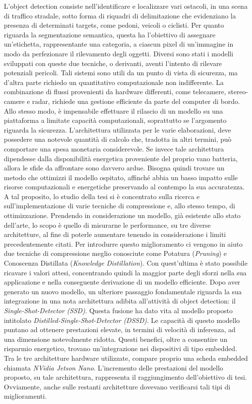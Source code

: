 L'object detection consiste nell'identificare e localizzare vari ostacoli, in una scena di traffico stradale, sotto forma di riquadri di delimitazione che evidenziano la presenza di determinati targets, come pedoni, veicoli o ciclisti. Per quanto riguarda la segmentazione semantica, questa ha l'obiettivo di assegnare un'etichetta, rappresentante una categoria, a ciascun pixel di un'immagine in modo da perfezionare il rilevamento degli oggetti. Diversi sono stati i modelli sviluppati con queste due tecniche, o derivanti, aventi l'intento di rilevare potenziali pericoli. Tali sistemi sono utili da un punto di vista di sicurezza, ma d'altra parte richiedo un quantitativo computazionale non indifferente. La combinazione di flussi provenienti da hardware differenti, come telecamere, stereo-camere e radar, richiede una gestione efficiente da parte del computer di bordo. Allo stesso modo, è impensabile effettuare il rilascio di un modello su una piattaforma a limitate capacità computazionali, soprattutto se l'argomento riguarda la sicurezza. L'architettura utilizzata per le varie elaborazioni, deve possedere una notevole quantità di calcolo che, tradotta in altri termini, può comportare una spesa monetaria considerevole. Se invece tale architettura dipendesse dalla disponibilità energetica proveniente del proprio vano batteria, allora le sfide da affrontare sono davvero ardue. Bisogna quindi trovare un metodo che ottimizzi il modello ospitato, affinché abbia un basso impatto sulle risorse computazionali e energetiche preservando al contempo la sua accuratezza. A tal proposito, lo studio della tesi si è concentrato sulla ricerca e sull'implementazione di varie tecniche di compressione e, allo stesso tempo, di ottimizzazione. Prendendo in considerazione un modello, già esistente allo stato dell'arte, lo scopo è quello di misurarne le performance, su tre diverse architetture, al fine di poterle aumentare tenendo in considerazione i limiti precedentemente citati. Per introdurre questo miglioramento ci vengono in aiuto due tecniche di compressione meglio conosciute come Potatura (\emph{Pruning}) e Conoscenza Distillata (\emph{Knowledge Distillation}).
Con quest'ultima è stato possibile ricavare i valori attesi, concentrando quindi la maggior parte degli sforzi nella sua applicazione e nella conseguente derivazione di un modello efficiente. Dopo aver generato un nuovo modello, un ulteriore passaggio fondamentale riguarda la sua integrazione in una nota architettura adibita all'attività di object detection: il \emph{Single-Shot-Detector (SSD)}.
Questa fusione ha dato vita al modello proposto intitolato \emph{Distilled-Single-Shot-Detector (DSSD)}. Le capacità di questo modello puntano ad ottenere prestazioni elevate, in termini di velocità di inferenza, ad una dimensione notevolmente ridotta. Questi benefici, oltre a consentire un risparmio energetico, trovano un'integrazione nei dispositivi di tipo embedded. Tra le tre architetture hardware utilizzate, compare proprio una scheda embedded chiamata \emph{NVidia Jetson Nano}.
L'incremento delle prestazioni del modello proposto, su tale architettura, rappresenta il raggiungimento dell'obiettivo di tesi. Ovviamente, anche sulle restanti architetture dovevano verificarsi tali tipi di miglioramenti. 

